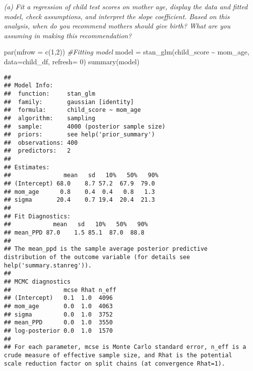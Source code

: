 \documentclass[
]{article}
\newenvironment{Shaded}{\begin{snugshade}}{\end{snugshade}}
\newcommand{\AttributeTok}[1]{\textcolor[rgb]{0.77,0.63,0.00}{#1}}
\newcommand{\CommentTok}[1]{\textcolor[rgb]{0.56,0.35,0.01}{\textit{#1}}}
\newcommand{\DecValTok}[1]{\textcolor[rgb]{0.00,0.00,0.81}{#1}}
\newcommand{\FunctionTok}[1]{\textcolor[rgb]{0.00,0.00,0.00}{#1}}
\newcommand{\NormalTok}[1]{#1}
\newcommand{\OtherTok}[1]{\textcolor[rgb]{0.56,0.35,0.01}{#1}}
\newcommand{\SpecialCharTok}[1]{\textcolor[rgb]{0.00,0.00,0.00}{#1}}
\begin{document}
\emph{(a) Fit a regression of child test scores on mother age, display
the data and fitted model, check assumptions, and interpret the slope
coefficient. Based on this analysis, when do you recommend mothers
should give birth? What are you assuming in making this recommendation?}

\begin{Shaded}
\begin{Highlighting}[]
\FunctionTok{par}\NormalTok{(}\AttributeTok{mfrow =} \FunctionTok{c}\NormalTok{(}\DecValTok{1}\NormalTok{,}\DecValTok{2}\NormalTok{))}
\CommentTok{\#Fitting model}
\NormalTok{model }\OtherTok{=} \FunctionTok{stan\_glm}\NormalTok{(child\_score }\SpecialCharTok{\textasciitilde{}}\NormalTok{ mom\_age, }\AttributeTok{data=}\NormalTok{child\_df, }\AttributeTok{refresh=} \DecValTok{0}\NormalTok{)}
\FunctionTok{summary}\NormalTok{(model)}
\end{Highlighting}
\end{Shaded}

\begin{verbatim}
## 
## Model Info:
##  function:     stan_glm
##  family:       gaussian [identity]
##  formula:      child_score ~ mom_age
##  algorithm:    sampling
##  sample:       4000 (posterior sample size)
##  priors:       see help('prior_summary')
##  observations: 400
##  predictors:   2
## 
## Estimates:
##               mean   sd   10%   50%   90%
## (Intercept) 68.0    8.7 57.2  67.9  79.0 
## mom_age      0.8    0.4  0.4   0.8   1.3 
## sigma       20.4    0.7 19.4  20.4  21.3 
## 
## Fit Diagnostics:
##            mean   sd   10%   50%   90%
## mean_PPD 87.0    1.5 85.1  87.0  88.8 
## 
## The mean_ppd is the sample average posterior predictive distribution of the outcome variable (for details see help('summary.stanreg')).
## 
## MCMC diagnostics
##               mcse Rhat n_eff
## (Intercept)   0.1  1.0  4096 
## mom_age       0.0  1.0  4063 
## sigma         0.0  1.0  3752 
## mean_PPD      0.0  1.0  3550 
## log-posterior 0.0  1.0  1570 
## 
## For each parameter, mcse is Monte Carlo standard error, n_eff is a crude measure of effective sample size, and Rhat is the potential scale reduction factor on split chains (at convergence Rhat=1).
\end{verbatim}

\begin{Shaded}
\end{Shaded}
\end{document}
